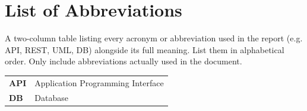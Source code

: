 \newpage
\section*{List of Abbreviations}

A two-column table listing every acronym or abbreviation used in the report (e.g. API, REST, UML, DB) alongside its full meaning. List them in alphabetical order. Only include abbreviations actually used in the document.\\

\begin{tabular}{ll}
  \textbf{API} & Application Programming Interface \\
  \textbf{DB}  & Database \\
\end{tabular}
